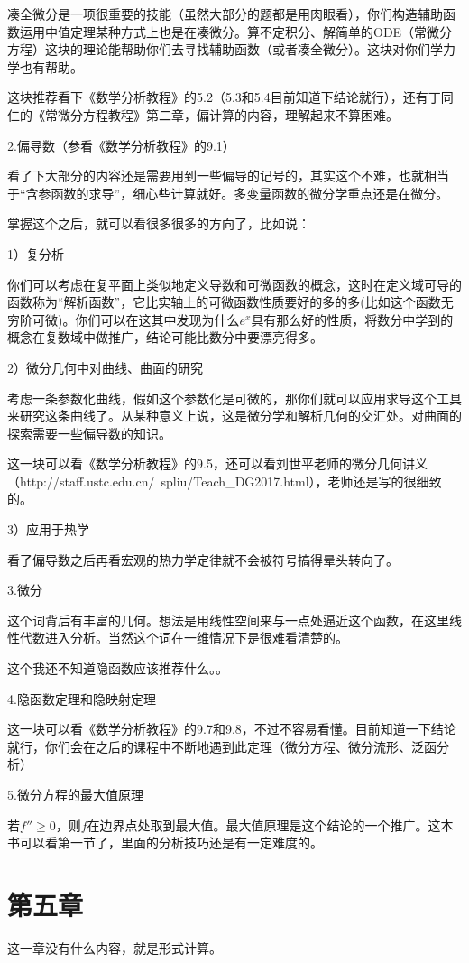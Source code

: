 \documentclass{ctexart}
\begin{document}
凑全微分是一项很重要的技能（虽然大部分的题都是用肉眼看），你们构造辅助函数运用中值定理某种方式上也是在凑微分。算不定积分、解简单的ODE（常微分方程）这块的理论能帮助你们去寻找辅助函数（或者凑全微分）。这块对你们学力学也有帮助。

这块推荐看下《数学分析教程》的5.2（5.3和5.4目前知道下结论就行），还有丁同仁的《常微分方程教程》第二章，偏计算的内容，理解起来不算困难。

2.偏导数（参看《数学分析教程》的9.1）

看了下大部分的内容还是需要用到一些偏导的记号的，其实这个不难，也就相当于“含参函数的求导”，细心些计算就好。多变量函数的微分学重点还是在微分。

掌握这个之后，就可以看很多很多的方向了，比如说：

1）复分析

你们可以考虑在复平面上类似地定义导数和可微函数的概念，这时在定义域可导的函数称为“解析函数”，它比实轴上的可微函数性质要好的多的多(比如这个函数无穷阶可微)。你们可以在这其中发现为什么$e^x$具有那么好的性质，将数分中学到的概念在复数域中做推广，结论可能比数分中要漂亮得多。

2）微分几何中对曲线、曲面的研究

考虑一条参数化曲线，假如这个参数化是可微的，那你们就可以应用求导这个工具来研究这条曲线了。从某种意义上说，这是微分学和解析几何的交汇处。对曲面的探索需要一些偏导数的知识。

这一块可以看《数学分析教程》的9.5，还可以看刘世平老师的微分几何讲义（http://staff.ustc.edu.cn/~spliu/Teach\_DG2017.html），老师还是写的很细致的。

3）应用于热学

看了偏导数之后再看宏观的热力学定律就不会被符号搞得晕头转向了。

3.微分

这个词背后有丰富的几何。想法是用线性空间来与一点处逼近这个函数，在这里线性代数进入分析。当然这个词在一维情况下是很难看清楚的。

这个我还不知道隐函数应该推荐什么。。

4.隐函数定理和隐映射定理

这一块可以看《数学分析教程》的9.7和9.8，不过不容易看懂。目前知道一下结论就行，你们会在之后的课程中不断地遇到此定理（微分方程、微分流形、泛函分析）

5.微分方程的最大值原理

若$f'' \geqslant0$，则$f$在边界点处取到最大值。最大值原理是这个结论的一个推广。这本书可以看第一节了，里面的分析技巧还是有一定难度的。

\section{第五章}
这一章没有什么内容，就是形式计算。
\end{document}
